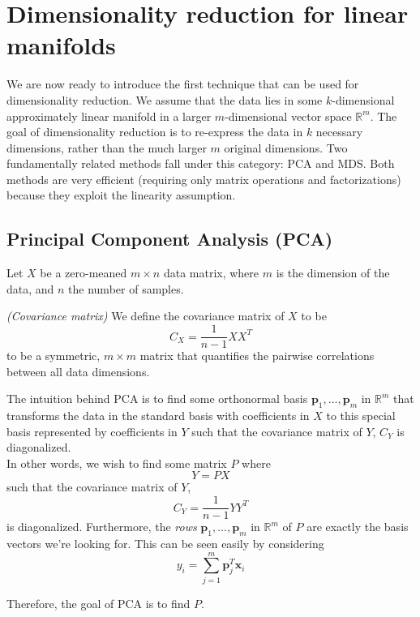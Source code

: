 \documentclass[11pt]{article}
\newenvironment{definition}[1][Definition]{\begin{trivlist}
\item[\hskip \labelsep {\bfseries #1}]}{\end{trivlist}}
\begin{document}
\section*{Dimensionality reduction for linear manifolds}

We are now ready to introduce the first technique that can be used for dimensionality reduction. We assume that the data lies in some $k$-dimensional approximately linear manifold in a larger $m$-dimensional vector space $\mathbb{R}^m$. The goal of dimensionality reduction is to re-express the data in $k$ necessary dimensions, rather than the much larger $m$ original dimensions. Two fundamentally related methods fall under this category: PCA and MDS. Both methods are very efficient (requiring only matrix operations and factorizations) because they exploit the linearity assumption.

\subsection*{Principal Component Analysis (PCA)}

Let $X$ be a zero-meaned $m \times n$ data matrix, where $m$ is the dimension of the data, and $n$ the number of samples.

\begin{definition}
\emph{(Covariance matrix)}
\label{Cov}
We define the covariance matrix of $X$ to be
\[C_X = \frac{1}{n-1} XX^T\]
 to be a symmetric, $m \times m$ matrix that quantifies the pairwise correlations between all data dimensions.
\end{definition}

The intuition behind PCA is to find some orthonormal basis $\mathbf{p}_1, \ldots, \mathbf{p}_m$ in $\mathbb{R}^m$ that transforms the data in the standard basis with coefficients in $X$ to this special basis represented by coefficients in $Y$ such that the covariance matrix of $Y$, $C_Y$ is diagonalized. \\

In other words, we wish to find some matrix $P$ where
\[Y = PX\]
such that the covariance matrix of $Y$,
\[C_Y = \frac{1}{n-1} YY^T\]
is diagonalized. Furthermore, the \textit{rows} $\mathbf{p}_1, \ldots, \mathbf{p}_m$ in $\mathbb{R}^m$ of $P$ are exactly the basis vectors we're looking for. This can be seen easily by considering
\[y_i = \sum_{j=1}^m \mathbf{p}_j^T \mathbf{x}_i \]

Therefore, the goal of PCA is to find $P$. \\
\end{document}
